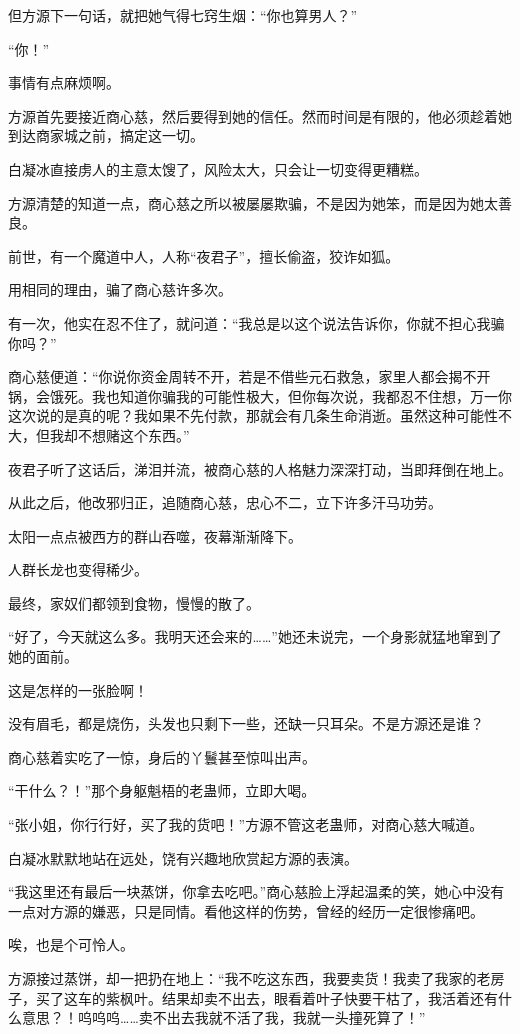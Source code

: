 \begin{this_body}
但方源下一句话，就把她气得七窍生烟：“你也算男人？”

“你！”

事情有点麻烦啊。

方源首先要接近商心慈，然后要得到她的信任。然而时间是有限的，他必须趁着她到达商家城之前，搞定这一切。

白凝冰直接虏人的主意太馊了，风险太大，只会让一切变得更糟糕。

方源清楚的知道一点，商心慈之所以被屡屡欺骗，不是因为她笨，而是因为她太善良。

前世，有一个魔道中人，人称“夜君子”，擅长偷盗，狡诈如狐。

用相同的理由，骗了商心慈许多次。

有一次，他实在忍不住了，就问道：“我总是以这个说法告诉你，你就不担心我骗你吗？”

商心慈便道：“你说你资金周转不开，若是不借些元石救急，家里人都会揭不开锅，会饿死。我也知道你骗我的可能性极大，但你每次说，我都忍不住想，万一你这次说的是真的呢？我如果不先付款，那就会有几条生命消逝。虽然这种可能性不大，但我却不想赌这个东西。”

夜君子听了这话后，涕泪并流，被商心慈的人格魅力深深打动，当即拜倒在地上。

从此之后，他改邪归正，追随商心慈，忠心不二，立下许多汗马功劳。

太阳一点点被西方的群山吞噬，夜幕渐渐降下。

人群长龙也变得稀少。

最终，家奴们都领到食物，慢慢的散了。

“好了，今天就这么多。我明天还会来的……”她还未说完，一个身影就猛地窜到了她的面前。

这是怎样的一张脸啊！

没有眉毛，都是烧伤，头发也只剩下一些，还缺一只耳朵。不是方源还是谁？

商心慈着实吃了一惊，身后的丫鬟甚至惊叫出声。

“干什么？！”那个身躯魁梧的老蛊师，立即大喝。

“张小姐，你行行好，买了我的货吧！”方源不管这老蛊师，对商心慈大喊道。

白凝冰默默地站在远处，饶有兴趣地欣赏起方源的表演。

“我这里还有最后一块蒸饼，你拿去吃吧。”商心慈脸上浮起温柔的笑，她心中没有一点对方源的嫌恶，只是同情。看他这样的伤势，曾经的经历一定很惨痛吧。

唉，也是个可怜人。

方源接过蒸饼，却一把扔在地上：“我不吃这东西，我要卖货！我卖了我家的老房子，买了这车的紫枫叶。结果却卖不出去，眼看着叶子快要干枯了，我活着还有什么意思？！呜呜呜……卖不出去我就不活了我，我就一头撞死算了！”


\end{this_body}
